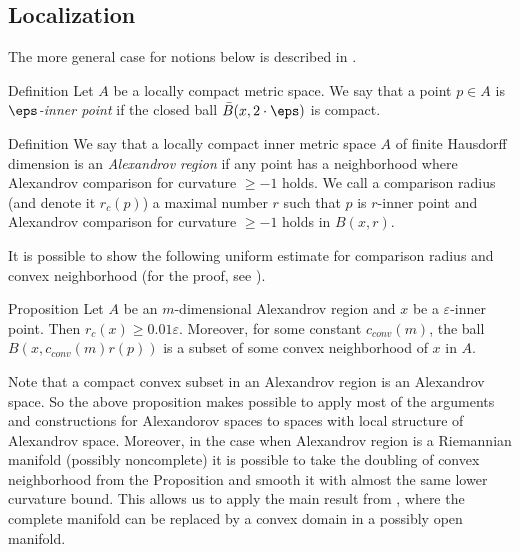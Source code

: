 \subsection{Localization}\label{sec:local}

The more general case for notions below is described in \cite{LNep}.

\begin{rdef}{Definition}
Let $A$ be a locally compact metric space. 
We say that a point  $p\in A$
is  \emph{ $\eps$-inner point} if
the closed ball $\bar B(x,2\cdot\eps)$ is compact.

\end{rdef}

\begin{rdef}{Definition}
We say that
 a locally compact inner metric space $A$ of finite Hausdorff dimension
is an \emph{ Alexandrov region} if
any point has a neighborhood where Alexandrov
comparison for curvature $\ge -1$ holds.
We call a comparison 
radius (and denote it $r_c(p)$) a maximal number $r$ such that
$p$ is $r$-inner point and 
 Alexandrov
comparison for curvature $\ge -1$ holds in
$B(x,r)$.


\end{rdef}
It is possible to show the following uniform estimate for
comparison radius and convex neighborhood (for the proof, see \cite{LNep}).

\begin{thm}{Proposition}
Let $A$ be an $m$-dimensional Alexandrov region
and $x$ be a $\varepsilon$-inner
point. Then 
 $r_c(x)\ge 0.01\varepsilon$.
Moreover,  for some constant $c_{conv}(m)$,
the ball $B(x, c_{conv}(m)r(p))$ is a subset of some
convex
neighborhood of $x$ in $A$.

\end{thm}

Note that a compact convex subset in an Alexandrov region is an Alexandrov space.
So the above proposition
makes possible 
to apply most of the arguments and constructions for Alexandorov spaces to
spaces
  with local structure of Alexandrov space. 
  Moreover, in the case when Alexandrov region
  is a Riemannian 
manifold (possibly noncomplete) it is possible
to take the doubling of convex neighborhood from the Proposition
and smooth it with almost the same lower curvature bound.
This allows us to apply the main result from
 \cite{petrunin-SC}, where the complete manifold can be replaced by a convex domain  in a possibly open manifold. 

